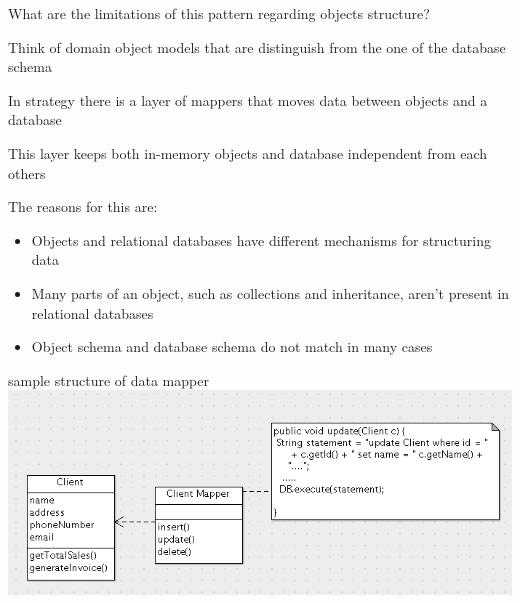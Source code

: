 \documentclass{beamer}
\begin{document}
\begin{slide}{
\item What are the limitations of this pattern regarding objects structure? 
\pause
\item Think of domain object models that are distinguish from the one of the database schema
}\end{slide}


\begin{slide}{
\item In strategy there is a layer of mappers that moves data between objects and a database 
\item This layer keeps both in-memory objects and database independent from each others 
\item The reasons for this are:
\pause
\begin{itemize}
\item Objects and relational databases have different mechanisms for structuring data
\pause
\item Many parts of an object, such as collections and inheritance, aren't present in relational databases
\item Object schema and database schema do not match in many cases
\end{itemize}
}\end{slide}


\begin{slide}{
\item sample structure of data mapper 
\\
\includegraphics[scale=0.4]{img/databaseMapperSketch.png}
}\end{slide}
\end{document}
